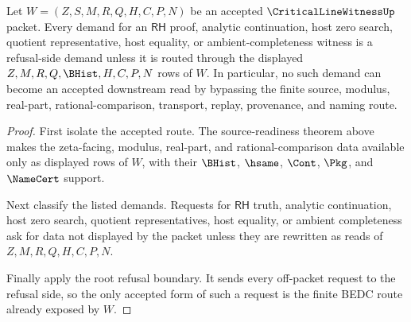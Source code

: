 \begin{theorem}
\label{thm:critical-line-witness-root-gap-refusal-completeness}
Let $W=(Z,S,M,R,Q,H,C,P,N)$ be an accepted $\CriticalLineWitnessUp$ packet. Every demand for an $\mathsf{RH}$ proof, analytic continuation, host zero search, quotient representative, host equality, or ambient-completeness witness is a refusal-side demand unless it is routed through the displayed $Z,M,R,Q,\BHist,H,C,P,N$ rows of $W$. In particular, no such demand can become an accepted downstream read by bypassing the finite source, modulus, real-part, rational-comparison, transport, replay, provenance, and naming route.
\end{theorem}
\begin{proof}
First isolate the accepted route. The source-readiness theorem above makes the zeta-facing, modulus, real-part, and rational-comparison data available only as displayed rows of $W$, with their $\BHist$, $\hsame$, $\Cont$, $\Pkg$, and $\NameCert$ support.

Next classify the listed demands. Requests for $\mathsf{RH}$ truth, analytic continuation, host zero search, quotient representatives, host equality, or ambient completeness ask for data not displayed by the packet unless they are rewritten as reads of $Z,M,R,Q,H,C,P,N$.

Finally apply the root refusal boundary. It sends every off-packet request to the refusal side, so the only accepted form of such a request is the finite BEDC route already exposed by $W$.
\end{proof}


